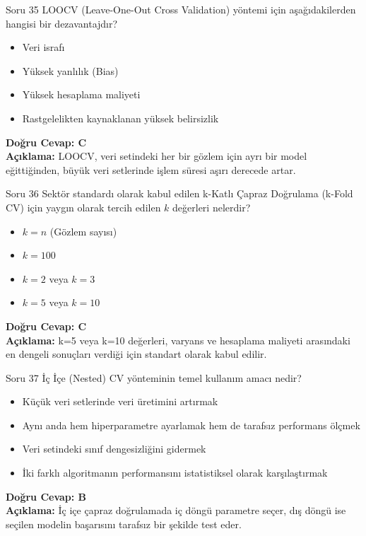 \documentclass[12pt,a4paper]{article}
\begin{document}
\begin{testcard}{Soru 35}
    LOOCV (Leave-One-Out Cross Validation) yöntemi için aşağıdakilerden hangisi bir dezavantajdır?
    \begin{itemize}
        \item[A)] Veri israfı
        \item[B)] Yüksek yanlılık (Bias)
        \item[C)] Yüksek hesaplama maliyeti
        \item[D)] Rastgelelikten kaynaklanan yüksek belirsizlik
    \end{itemize}
    \tcblower
    \textbf{Doğru Cevap: C} \\
    \textbf{Açıklama:} LOOCV, veri setindeki her bir gözlem için ayrı bir model eğittiğinden, büyük veri setlerinde işlem süresi aşırı derecede artar.
\end{testcard}

\begin{testcard}{Soru 36}
    Sektör standardı olarak kabul edilen k-Katlı Çapraz Doğrulama (k-Fold CV) için yaygın olarak tercih edilen $k$ değerleri nelerdir?
    \begin{itemize}
        \item[A)] $k = n$ (Gözlem sayısı)
        \item[B)] $k = 100$
        \item[C)] $k = 2$ veya $k = 3$
        \item[D)] $k = 5$ veya $k = 10$
    \end{itemize}
    \tcblower
    \textbf{Doğru Cevap: C} \\
    \textbf{Açıklama:} k=5 veya k=10 değerleri, varyans ve hesaplama maliyeti arasındaki en dengeli sonuçları verdiği için standart olarak kabul edilir.
\end{testcard}

\begin{testcard}{Soru 37}
    İç İçe (Nested) CV yönteminin temel kullanım amacı nedir?
    \begin{itemize}
        \item[A)] Küçük veri setlerinde veri üretimini artırmak
        \item[B)] Aynı anda hem hiperparametre ayarlamak hem de tarafsız performans ölçmek
        \item[C)] Veri setindeki sınıf dengesizliğini gidermek
        \item[D)] İki farklı algoritmanın performansını istatistiksel olarak karşılaştırmak
    \end{itemize}
    \tcblower
    \textbf{Doğru Cevap: B} \\
    \textbf{Açıklama:} İç içe çapraz doğrulamada iç döngü parametre seçer, dış döngü ise seçilen modelin başarısını tarafsız bir şekilde test eder.
\end{testcard}
\end{document}
